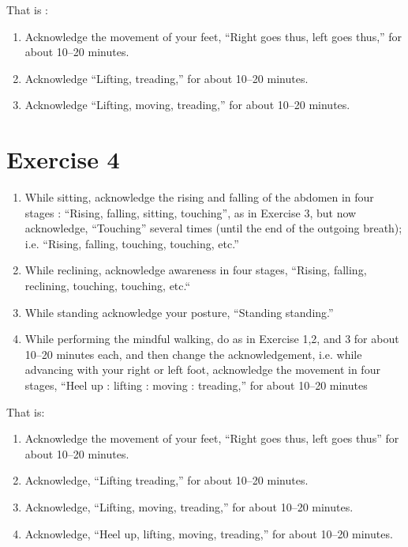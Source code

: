 \documentclass[a5paper,10pt,english]{book}
\begin{document}
\sphinxAtStartPar
That is :
\begin{enumerate}
%
\item {} 
\sphinxAtStartPar
Acknowledge the movement of your feet, “Right goes thus, left goes thus,” for about 10–20 minutes.

\item {} 
\sphinxAtStartPar
Acknowledge “Lifting, treading,” for about 10–20 minutes.

\item {} 
\sphinxAtStartPar
Acknowledge “Lifting, moving, treading,” for about 10–20 minutes.

\end{enumerate}


\section{Exercise 4}
\label{\detokenize{practice:exercise-4}}\begin{enumerate}
%
\item {} 
\sphinxAtStartPar
While sitting, acknowledge the rising and falling of the abdomen in four stages : “Rising, falling, sitting, touching”, as in Exercise 3, but now acknowledge, “Touching” several times (until the end of the out\sphinxhyphen{}going breath); i.e. “Rising, falling, touching, touching, etc.”

\item {} 
\sphinxAtStartPar
While reclining, acknowledge awareness in four stages, “Rising, falling, reclining, touching, touching, etc.“

\item {} 
\sphinxAtStartPar
While standing acknowledge your posture, “Standing standing.”

\item {} 
\sphinxAtStartPar
While performing the mindful walking, do as in Exercise 1,2, and 3 for about 10–20 minutes each, and then change the acknowledgement, i.e. while advancing with your right or left foot, acknowledge the movement in four stages, “Heel up : lifting : moving : treading,” for about 10–20 minutes

\end{enumerate}

\sphinxAtStartPar
That is:
\begin{enumerate}
%
\item {} 
\sphinxAtStartPar
Acknowledge the movement of your feet, “Right goes thus, left goes thus” for about 10–20 minutes.

\item {} 
\sphinxAtStartPar
Acknowledge, “Lifting treading,” for about 10–20 minutes.

\item {} 
\sphinxAtStartPar
Acknowledge, “Lifting, moving, treading,” for about 10–20 minutes.

\item {} 
\sphinxAtStartPar
Acknowledge, “Heel up, lifting, moving, treading,” for about 10–20 minutes.

\end{enumerate}
\end{document}
